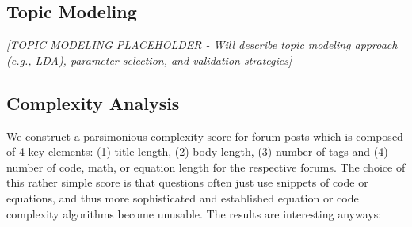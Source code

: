 
\subsection{Topic Modeling}
\textit{[TOPIC MODELING PLACEHOLDER - Will describe topic modeling approach (e.g., LDA), parameter selection, and validation strategies]}


\subsection{Complexity Analysis}

We construct a parsimonious complexity score for forum posts which is composed of 4 key elements: (1) title length, (2) body length, (3) number of tags and (4) number of code, math, or equation length for the respective forums. The choice of this rather simple score is that questions often just use snippets of code or equations, and thus more sophisticated and established equation or code complexity algorithms become unusable. The results are interesting anyways:


